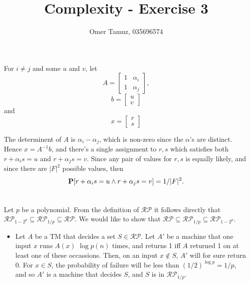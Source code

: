\documentclass[11pt]{article} \usepackage{amssymb}
\begin{document}
\title{Complexity - Exercise 3}

 \author{Omer Tamuz, 035696574}
\maketitle


\section{}
    For $i\neq j$ and some $u$ and $v$, let 
    \begin{equation*}
      A=
      \begin{bmatrix}
        1& \alpha_i\\ 
        1& \alpha_j
      \end{bmatrix},
    \end{equation*}
    \begin{equation*}
      b=
      \begin{bmatrix}
        u\\ 
        v
      \end{bmatrix}
    \end{equation*}
    and
    \begin{equation*}
      x=
      \begin{bmatrix}
        r\\ 
        s
      \end{bmatrix}
    \end{equation*}

    The determinent of $A$ is $\alpha_i-\alpha_j$, which is
    non-zero since the $\alpha$'s are distinct. Hence $x=A^{-1}b$, and there's
    a single assignment to $r,s$ which satisfies both $r+\alpha_is=u$ and
    $r+\alpha_js=v$. Since any pair of values for $r,s$ is equally likely, and
    since there are $|F|^2$ possible values, then
    $$\P[r+\alpha_is=u \wedge r+\alpha_js=v]=1/|F|^2.$$
\section{}
\subsection{}
Let $p$ be a polynomial.
From the definition of $\mathcal{RP}$ it follows directly that 
$\mathcal{RP}_{1-2^p} \subseteq \mathcal{RP}_{1/p} \subseteq \mathcal{RP}$. 
We would like to show that 
$\mathcal{RP} \subseteq \mathcal{RP}_{1/p} \subseteq \mathcal{RP}_{1-2^p}$.


\begin{itemize}
\item 
  Let $A$ be a TM that decides a set $S\in\mathcal{RP}$. Let $A'$ be a 
  machine that one input $x$ runs $A(x)$ $\log p(n)$ times, 
  and returns 1 iff $A$ returned 1
  on at least one of these occassions. Then, on an input $x\not\in S$, $A'$ will
  for sure return 0. For $x\in S$, the probability of failure will be
  less than $(1/2)^{\log p}=1/p$, and so $A'$ is a machine that decides
  $S$, and $S$ is in $\mathcal{RP}_{1/p}$.


\end{itemize}
\end{document}
